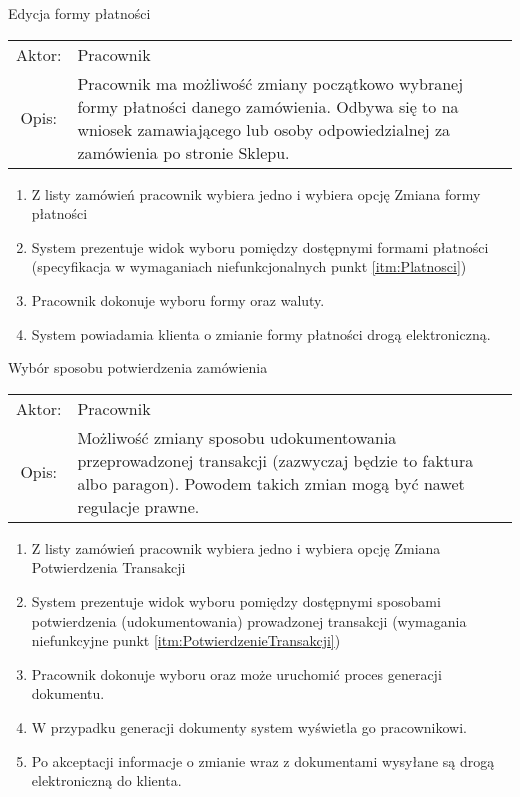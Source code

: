   \item Edycja formy płatności\\
  \begin{tabularx}{\linewidth}{c X}
  Aktor: & Pracownik \\
  Opis: & Pracownik ma możliwość zmiany początkowo wybranej formy płatności
  danego zamówienia. Odbywa się to na wniosek zamawiającego lub osoby
  odpowiedzialnej za zamówienia po stronie Sklepu.
  \end{tabularx}    
	\begin{enumerate}
	  \item Z listy zamówień pracownik wybiera jedno i wybiera opcję Zmiana formy
	  płatności
	  \item System prezentuje widok wyboru pomiędzy dostępnymi formami płatności
	  (specyfikacja w wymaganiach niefunkcjonalnych punkt \ref{itm:Platnosci})
	  \item Pracownik dokonuje wyboru formy oraz waluty.
	  \item System powiadamia klienta o zmianie formy płatności drogą elektroniczną.
	\end{enumerate}

  \item Wybór sposobu potwierdzenia zamówienia\\
  \begin{tabularx}{\linewidth}{c X}
  Aktor: & Pracownik \\
  Opis: & Możliwość zmiany sposobu udokumentowania przeprowadzonej transakcji
  (zazwyczaj będzie to faktura albo paragon). Powodem takich zmian mogą być
  nawet regulacje prawne.
  \end{tabularx}	
	\begin{enumerate}
	  \item Z listy zamówień pracownik wybiera jedno i wybiera opcję Zmiana
	  Potwierdzenia Transakcji
	  \item System prezentuje widok wyboru pomiędzy dostępnymi sposobami
	  potwierdzenia (udokumentowania) prowadzonej transakcji (wymagania
	  niefunkcyjne punkt \ref{itm:PotwierdzenieTransakcji})
	  \item Pracownik dokonuje wyboru oraz może uruchomić proces generacji
	  dokumentu.
	  \item W przypadku generacji dokumenty system wyświetla go pracownikowi.
	  \item Po akceptacji informacje o zmianie wraz z dokumentami wysyłane są drogą
	  elektroniczną do klienta.
	\end{enumerate}

